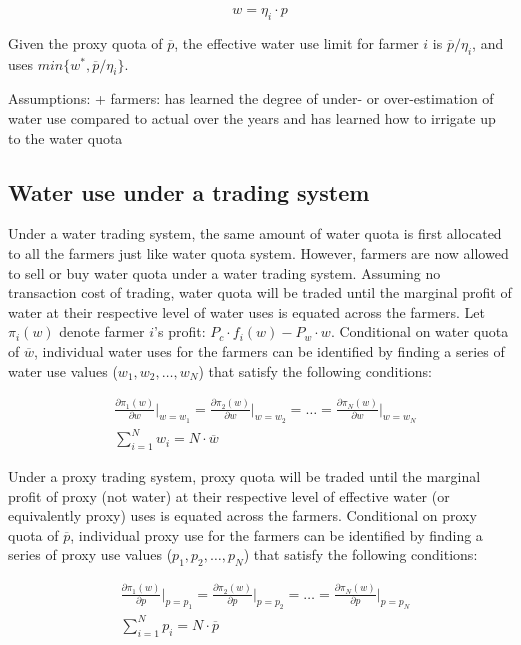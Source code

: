 \documentclass[
]{article}
\begin{document}
\begin{equation}
w = \eta_i \cdot p
\end{equation}

Given the proxy quota of \(\overline{p}\), the effective water use limit for farmer \(i\) is \(\overline{p} / \eta_i\), and uses \(min\{w^*, \overline{p} / \eta_i\}\).

Assumptions:
+ farmers: has learned the degree of under- or over-estimation of water use compared to actual over the years and has learned how to irrigate up to the water quota

\subsection{Water use under a trading system}\label{water-use-under-a-trading-system}

Under a water trading system, the same amount of water quota is first allocated to all the farmers just like water quota system. However, farmers are now allowed to sell or buy water quota under a water trading system. Assuming no transaction cost of trading, water quota will be traded until the marginal profit of water at their respective level of water uses is equated across the farmers. Let \(\pi_i(w)\) denote farmer \(i\)'s profit: \(P_c \cdot f_i(w) - P_w \cdot w\). Conditional on water quota of \(\overline{w}\), individual water uses for the farmers can be identified by finding a series of water use values (\(w_1, w_2, \dots, w_N\)) that satisfy the following conditions:

\begin{align}
& \frac{\partial \pi_1(w)}{\partial w}\Big\rvert_{w = w_1} = \frac{\partial \pi_2(w)}{\partial w}\Big\rvert_{w = w_2} = \dots = \frac{\partial \pi_N(w)}{\partial w}\Big\rvert_{w = w_N} \\
& \sum_{i=1}^N w_i = N \cdot \overline{w}
\end{align}

Under a proxy trading system, proxy quota will be traded until the marginal profit of proxy (not water) at their respective level of effective water (or equivalently proxy) uses is equated across the farmers. Conditional on proxy quota of \(\overline{p}\), individual proxy use for the farmers can be identified by finding a series of proxy use values (\(p_1, p_2, \dots, p_N\)) that satisfy the following conditions:

\begin{align}
& \frac{\partial \pi_1(w)}{\partial p}\Big\rvert_{p = p_1} = \frac{\partial \pi_2(w)}{\partial p}\Big\rvert_{p = p_2} = \dots = \frac{\partial \pi_N(w)}{\partial p}\Big\rvert_{p = p_N} \\
& \sum_{i=1}^N p_i = N \cdot \overline{p}
\end{align}
\end{document}
